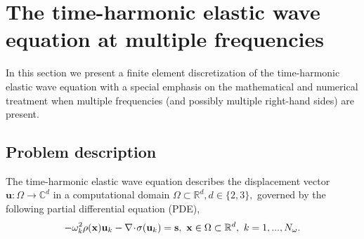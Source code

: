 \section{The time-harmonic elastic wave equation at multiple frequencies}
\label{sec:EWE}
In this section we present a finite element discretization of the time-harmonic elastic wave equation with a special emphasis on the mathematical and numerical treatment when multiple frequencies (and possibly multiple right-hand sides) are present.

\subsection{Problem description}
 The time-harmonic elastic wave equation describes the displacement vector $\mathbf{u}:\Omega \rightarrow \mathbb{C}^d$ in a computational domain $\Omega \subset \mathbb{R}^{d}, d \in \{2,3\},$ governed by the following partial differential equation (PDE),
 \begin{align}
 \label{LEWE}
 -{\omega}_k^2 \rho(\mathbf{x}) \mathbf{u}_k - \nabla \! \cdot \! \sigma(\mathbf{u}_k) = \mathbf{s} , \ \mathbf{x} \in \Omega \subset \mathbb{R}^{d}, \ k=1,...,{N_{\omega}}.
\end{align}

